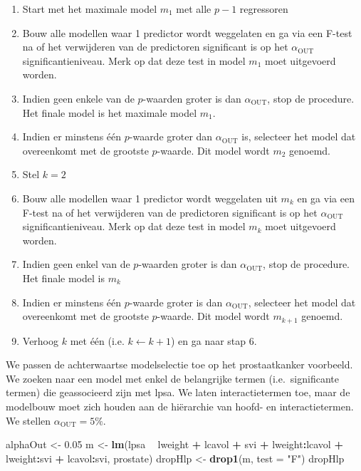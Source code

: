 \documentclass[12pt,dutch,coursenotes]{book}
\newenvironment{Shaded}{\begin{snugshade}}{\end{snugshade}}
\newcommand{\KeywordTok}[1]{\textcolor[rgb]{0.13,0.29,0.53}{\textbf{#1}}}
\newcommand{\DataTypeTok}[1]{\textcolor[rgb]{0.13,0.29,0.53}{#1}}
\newcommand{\FloatTok}[1]{\textcolor[rgb]{0.00,0.00,0.81}{#1}}
\newcommand{\StringTok}[1]{\textcolor[rgb]{0.31,0.60,0.02}{#1}}
\newcommand{\OperatorTok}[1]{\textcolor[rgb]{0.81,0.36,0.00}{\textbf{#1}}}
\newcommand{\NormalTok}[1]{#1}
\providecommand{\tightlist}{%
  \setlength{\itemsep}{0pt}\setlength{\parskip}{0pt}}
\theoremstyle{definition}
\theoremstyle{definition}
\theoremstyle{definition}
\theoremstyle{remark}
\begin{document}
\begin{enumerate}
\def\labelenumi{\arabic{enumi}.}
\tightlist
\item
  Start met het maximale model \(m_1\) met alle \(p-1\) regressoren
\item
  Bouw alle modellen waar 1 predictor wordt weggelaten en ga via een
  F-test na of het verwijderen van de predictoren significant is op het
  \(\alpha_{\text{OUT}}\) significantieniveau. Merk op dat deze test in
  model \(m_1\) moet uitgevoerd worden.
\item
  Indien geen enkele van de \(p\)-waarden groter is dan
  \(\alpha_{\text{OUT}}\), stop de procedure. Het finale model is het
  maximale model \(m_1\).
\item
  Indien er minstens één \(p\)-waarde groter dan \(\alpha_{\text{OUT}}\)
  is, selecteer het model dat overeenkomt met de grootste \(p\)-waarde.
  Dit model wordt \(m_2\) genoemd.
\item
  Stel \(k=2\)
\item
  Bouw alle modellen waar 1 predictor wordt weggelaten uit \(m_k\) en ga
  via een F-test na of het verwijderen van de predictoren significant is
  op het \(\alpha_{\text{OUT}}\) significantieniveau. Merk op dat deze
  test in model \(m_k\) moet uitgevoerd worden.
\item
  Indien geen enkel van de \(p\)-waarden groter is dan
  \(\alpha_{\text{OUT}}\), stop de procedure. Het finale model is
  \(m_k\)
\item
  Indien er minstens één \(p\)-waarde groter is dan
  \(\alpha_{\text{OUT}}\), selecteer het model dat overeenkomt met de
  grootste \(p\)-waarde. Dit model wordt \(m_{k+1}\) genoemd.
\item
  Verhoog \(k\) met één (i.e. \(k\leftarrow k+1\)) en ga naar stap 6.
\end{enumerate}

We passen de achterwaartse modelselectie toe op het prostaatkanker
voorbeeld. We zoeken naar een model met enkel de belangrijke termen
(i.e.~significante termen) die geassocieerd zijn met lpsa. We laten
interactietermen toe, maar de modelbouw moet zich houden aan de
hiërarchie van hoofd- en interactietermen. We stellen
\(\alpha_{\text{OUT}}=5\%\).

\begin{Shaded}
\begin{Highlighting}[]
\NormalTok{alphaOut <-}\StringTok{ }\FloatTok{0.05}
\NormalTok{m <-}\StringTok{ }\KeywordTok{lm}\NormalTok{(lpsa }\OperatorTok{~}\StringTok{ }\NormalTok{lweight }\OperatorTok{+}\StringTok{ }\NormalTok{lcavol }\OperatorTok{+}\StringTok{ }\NormalTok{svi }\OperatorTok{+}\StringTok{ }\NormalTok{lweight}\OperatorTok{:}\NormalTok{lcavol }\OperatorTok{+}\StringTok{ }
\StringTok{    }\NormalTok{lweight}\OperatorTok{:}\NormalTok{svi }\OperatorTok{+}\StringTok{ }\NormalTok{lcavol}\OperatorTok{:}\NormalTok{svi, prostate)}
\NormalTok{dropHlp <-}\StringTok{ }\KeywordTok{drop1}\NormalTok{(m, }\DataTypeTok{test =} \StringTok{"F"}\NormalTok{)}
\NormalTok{dropHlp}
\end{Highlighting}
\end{Shaded}
\end{document}
